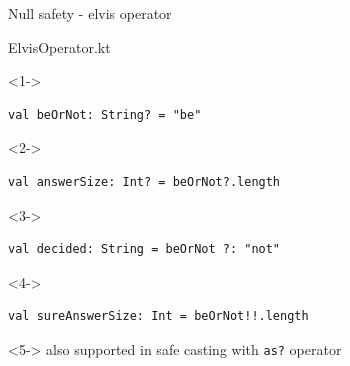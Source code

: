 \documentclass[hyperref={pdfpagelabels=false},xcolor={dvipsnames},compress]{beamer}
\begin{document}
    \begin{frame}[fragile]{Null safety - elvis operator}
        \begin{exampleblock}{ElvisOperator.kt}
            \begin{onlyenv}<1->
                \begin{lstlisting}
val beOrNot: String? = "be"
                \end{lstlisting}
            \end{onlyenv}
            \begin{onlyenv}<2->
                \begin{lstlisting}
val answerSize: Int? = beOrNot?.length
                \end{lstlisting}
            \end{onlyenv}
            \begin{onlyenv}<3->
                \begin{lstlisting}
val decided: String = beOrNot ?: "not"
                \end{lstlisting}
            \end{onlyenv}
            \begin{onlyenv}<4->
                \begin{lstlisting}
val sureAnswerSize: Int = beOrNot!!.length
                \end{lstlisting}
            \end{onlyenv}
        \end{exampleblock}

        \begin{onlyenv}<5->
            also supported in safe casting with \texttt{as?} operator
        \end{onlyenv}
    \end{frame}
\end{document}
